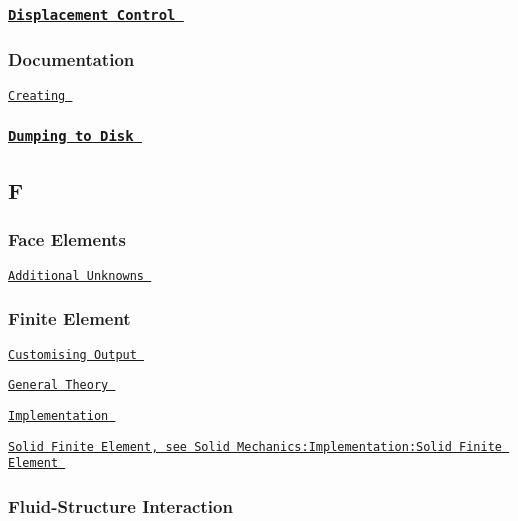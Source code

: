 \subsubsection*{ \href{ ../../beam/steady_ring/html/index.html#displ_control }{\tt Displacement Control } }

\subsubsection*{ Documentation }

 
\begin{DoxyItemize}
\item  \href{ ../../creating_doc/html/index.html }{\tt Creating }  
\end{DoxyItemize} \subsubsection*{ \href{ ../../unsteady_heat/two_d_unsteady_heat2/html/index.html }{\tt Dumping to Disk } }

 \subsection*{ F }

 \subsubsection*{ Face Elements }

 
\begin{DoxyItemize}
\item  \href{ ../../interaction/vmtk_fsi/html/index.htm#face }{\tt Additional Unknowns }  
\end{DoxyItemize} \subsubsection*{ Finite Element }

 
\begin{DoxyItemize}
\item  \href{ ../../solid/airy_cantilever/html/index.html#com }{\tt Customising Output }  
\item  \href{ ../../intro/html/index.html }{\tt General Theory }  
\item  \href{ ../../intro/html/index.html#towards_oo }{\tt Implementation }  
\item  \href{ ../../index/html/index.html#S.SolidMechanics.Implementation.SolidFiniteElement }{\tt Solid Finite Element, see Solid Mechanics\-:\-Implementation\-:Solid Finite Element }  
\end{DoxyItemize} \subsubsection*{ Fluid-\/\-Structure Interaction }

